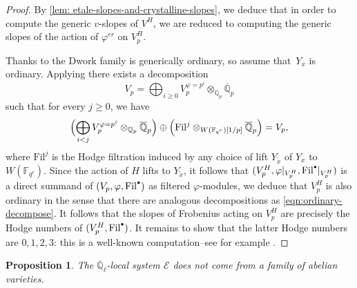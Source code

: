 \documentclass[JEP,XML,SOM,Unicode,published]{cedram}
\newcommand{\csbullet}{{\raisebox{1pt}{$\scriptscriptstyle\bullet$}}}
\numberwithin{equation}{subsection}
\newtheorem{prop}[thm]{Proposition}
\theoremstyle{definition}
\newcommand\Fil{\mathrm{Fil}}
\newcommand{\Qp}{\mathbb{Q}_p}
\newcommand{\Qpbar}{\overline{\mathbb Q}_p}
\newcommand{\Qlbar}{\overline{\mathbb{Q}}_{\ell}}
\begin{document}
\begin{proof}
By \cref{lem: etale-slopes-and-crystalline-slopes}, we deduce that in order to compute the generic $v$-slopes of $V^H$, we are reduced to computing the generic slopes of the action of $\varphi^{er}$ on $V_p^H$.

Thanks to \cite[Th.\,2.2]{Yu-Variation-of-the-Unit-Root-Along-the-Dwork-Family-of-Calabi-Yau-Varieties} the Dwork family is generically ordinary, so assume that~$Y_x$ is ordinary. Applying \cite[Prop.\,1.3.2]{Deligne-Cristaux-ordinaires-et-coordonnees-canoniques} there exists a decomposition
\[
V_p=\bigoplus_{i\geq 0}V_p^{\varphi=p^i}\otimes_{\Qp}\Qpbar
\]
such that for every $j\geq 0$, we have
\begin{equation}\label{eqn:ordinary-decompose} \Bigl(\bigoplus_{i<j}V_p^{\varphi=p^i}\otimes_{\Qp}\Qpbar\Bigr)\oplus\Bigl(\mathrm{Fil}^j\otimes_{W(\mathbb{F}_{q^r})[1/p]}\Qpbar\Bigr)=V_p,
\end{equation}
where $\mathrm{Fil}^j$ is the Hodge filtration induced by any choice of lift $Y_{\tilde{x}}$ of $Y_x$ to $W(\mathbb{F}_{q^r})$. Since the action of $H$ lifts to $Y_{\tilde{x}}$, it follows that $(V_p^H, \varphi|_{V_{p}^H}, \Fil^{\csbullet}|_{V_{p}^H})$ is a direct summand of $(V_p, \varphi, \Fil^{\csbullet})$ as filtered $\varphi$-modules, we deduce that $V_p^H$ is also ordinary in the sense that there are analogous decompositions as \eqref{eqn:ordinary-decompose}. It follows that the slopes of Frobenius acting on $V_p^H$ are precisely the Hodge numbers of $(V_p^H, \Fil^{\csbullet})$. It remains to show that the latter Hodge numbers are $0,1,2,3$: this is a well-known computation--see for example \cite[Lem.\,1.5]{Harris-Shepherd-Barron-Taylor-A-Family-of-Calabi-Yau-Varieties-and-Potential-Automorphy}.
\end{proof}

\begin{prop}\label{prop: F-isoc-of-Dwork-family-does-not-come-from-ab-var}
The $\Qlbar$-local system $\mathcal{E}$ does not come from a family of abelian varieties.
\end{prop}
\end{document}
